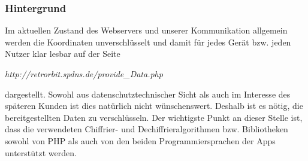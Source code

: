 \subsubsection{Hintergrund }
Im aktuellen Zustand des Webservers und unserer Kommunikation allgemein werden die Koordinaten unverschlüsselt und damit für jedes Gerät bzw. jeden Nutzer klar lesbar auf der Seite
 \begin{center}
 	\textit{http://retrorbit.spdns.de/provide\_Data.php }
 \end{center}
 dargestellt. Sowohl aus datenschutztechnischer Sicht als auch im Interesse des späteren Kunden ist dies natürlich nicht wünschenswert. Deshalb ist es nötig, die bereitgestellten Daten zu verschlüsseln. Der wichtigste Punkt an dieser Stelle ist, dass die verwendeten Chiffrier- und Dechiffrieralgorithmen bzw. Bibliotheken sowohl von PHP als auch von den beiden Programmiersprachen der Apps unterstützt werden.

